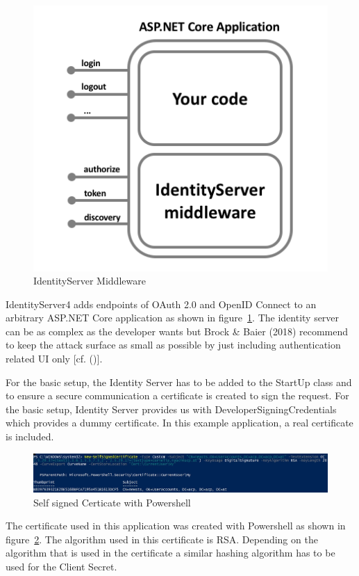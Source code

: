 \begin{figure}[h]
	\centering
	\includegraphics[width=0.6\linewidth]{images/middlewareIdentityServer}
	\caption{IdentityServer Middleware}
	\label{fig:middlewareidentityserver}
\end{figure}
 

IdentityServer4 adds endpoints of OAuth 2.0 and OpenID Connect to an arbitrary ASP.NET Core application as shown in figure~\ref{fig:middlewareidentityserver}. The identity server can be as complex as the developer wants but Brock \& Baier (2018) recommend to keep the attack surface as small as possible by just including authentication related UI only [cf. (\cite{Brock:2018:ID4})]. 


For the basic setup, the Identity Server has to be added to the StartUp class and to ensure a secure communication a certificate is created to sign the request. For the basic setup, Identity Server provides us with DeveloperSigningCredentials which provides a dummy certificate. In this example application, a real certificate is included. 

\begin{figure}[h]
	\centering
	\includegraphics[width=0.9\linewidth]{images/self-signed-certicate}
	\caption{Self signed Certicate with Powershell}
	\label{fig:self-signed-certicate}
\end{figure}

The certificate used in this application was created with Powershell as shown in figure~\ref{fig:self-signed-certicate}. The algorithm used in this certificate is RSA. Depending on the algorithm that is used in the certificate a similar hashing algorithm has to be used for the Client Secret.



